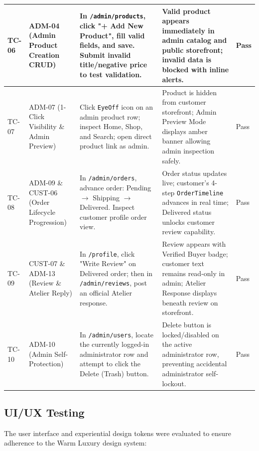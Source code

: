 \documentclass[12pt,a4paper,oneside]{report}
\begin{document}
\begin{longtable}{|p{1.3cm}|p{3.1cm}|p{4.6cm}|p{4.7cm}|p{1.1cm}|}
\hline
TC-06 & ADM-04 (Admin Product Creation CRUD) & In \texttt{/admin/products}, click "+ Add New Product", fill valid fields, and save. Submit invalid title/negative price to test validation. & Valid product appears immediately in admin catalog and public storefront; invalid data is blocked with inline alerts. & Pass \\
\hline
TC-07 & ADM-07 (1-Click Visibility \& Admin Preview) & Click \texttt{EyeOff} icon on an admin product row; inspect Home, Shop, and Search; open direct product link as admin. & Product is hidden from customer storefront; Admin Preview Mode displays amber banner allowing admin inspection safely. & Pass \\
\hline
TC-08 & ADM-09 \& CUST-06 (Order Lifecycle Progression) & In \texttt{/admin/orders}, advance order: Pending $\rightarrow$ Shipping $\rightarrow$ Delivered. Inspect customer profile order view. & Order status updates live; customer's 4-step \texttt{OrderTimeline} advances in real time; Delivered status unlocks customer review capability. & Pass \\
\hline
TC-09 & CUST-07 \& ADM-13 (Review \& Atelier Reply) & In \texttt{/profile}, click "Write Review" on Delivered order; then in \texttt{/admin/reviews}, post an official Atelier response. & Review appears with Verified Buyer badge; customer text remains read-only in admin; Atelier Response displays beneath review on storefront. & Pass \\
\hline
TC-10 & ADM-10 (Admin Self-Protection) & In \texttt{/admin/users}, locate the currently logged-in administrator row and attempt to click the Delete (Trash) button. & Delete button is locked/disabled on the active administrator row, preventing accidental administrator self-lockout. & Pass \\
\hline
\end{longtable}

\subsection{UI/UX Testing}
The user interface and experiential design tokens were evaluated to ensure adherence to the Warm Luxury design system:
\end{document}
